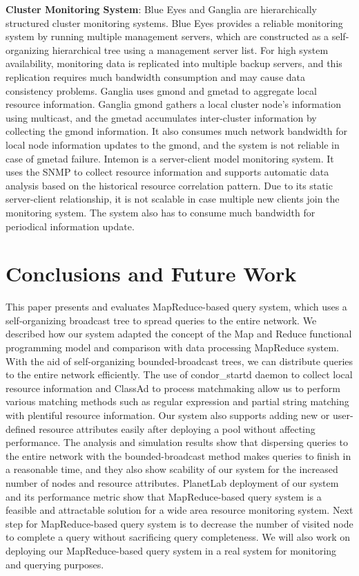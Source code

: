 \documentclass{acm_proc_article-sp}
\begin{document}
\textbf{Cluster Monitoring System}: Blue Eyes\cite{blueeyes} and Ganglia\cite{ganglia} are hierarchically structured cluster monitoring systems. 
Blue Eyes\cite{blueeyes} provides a reliable monitoring system by running multiple management servers, which are constructed as a self-organizing hierarchical tree using a management server list. 
For high system availability, monitoring data is replicated into multiple backup servers, and this replication requires much bandwidth consumption and may cause data consistency problems.
Ganglia\cite{ganglia} uses gmond and gmetad to aggregate local resource information. 
Ganglia gmond gathers a local cluster node's information using multicast, and the gmetad accumulates inter-cluster information by collecting the gmond information.
It also consumes much network bandwidth for local node information updates to the gmond, and the system is not reliable in case of gmetad failure.
Intemon\cite{intemon} is a server-client model monitoring system. It uses the SNMP to collect resource information and supports automatic data analysis based on the historical resource correlation pattern.
Due to its static server-client relationship, it is not scalable in case multiple new clients join the monitoring system. The system also has to consume much bandwidth for periodical information update.
\section{Conclusions and Future Work}
This paper presents and evaluates MapReduce-based query system, which uses a self-organizing broadcast tree to spread queries to the entire network.
We described how our system adapted the concept of the Map and Reduce functional programming model and comparison with data processing MapReduce system.
With the aid of self-organizing bounded-broadcast trees, we can distribute queries to the entire network efficiently. 
The use of condor\_startd daemon to collect local resource information and ClassAd to process matchmaking allow us to perform various matching methods such as regular expression and  partial string matching with plentiful resource information.
Our system also supports adding new or user-defined resource attributes easily after deploying a pool without affecting performance.
The analysis and simulation results show that dispersing queries to the entire network with the bounded-broadcast method makes queries to finish in a reasonable time, 
and they also show scability of our system for the increased number of nodes and resource attributes.
PlanetLab deployment of our system and its performance metric show that MapReduce-based query system is a feasible and attractable solution for a wide area resource monitoring system.
Next step for MapReduce-based query system is to decrease the number of visited node to complete a query without sacrificing query completeness.
We will also work on deploying our MapReduce-based query system in a real system for monitoring and querying purposes.




\balancecolumns
\end{document}
